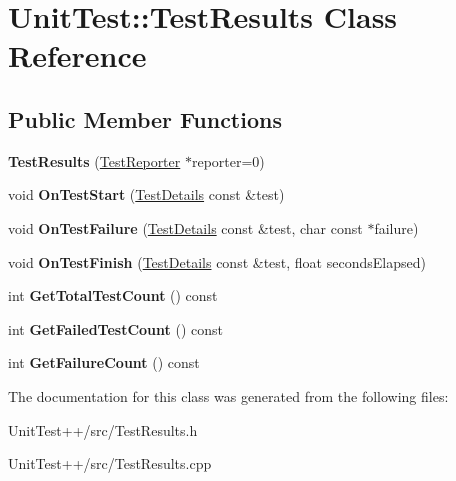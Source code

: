 \hypertarget{classUnitTest_1_1TestResults}{\section{Unit\-Test\-:\-:Test\-Results Class Reference}
\label{classUnitTest_1_1TestResults}
}
\subsection*{Public Member Functions}
\begin{DoxyCompactItemize}
\item 
\hypertarget{classUnitTest_1_1TestResults_af4e4405017e0c8e5dd8cca212adf049b}{{\bfseries Test\-Results} (\hyperlink{classUnitTest_1_1TestReporter}{Test\-Reporter} $\ast$reporter=0)}\label{classUnitTest_1_1TestResults_af4e4405017e0c8e5dd8cca212adf049b}

\item 
\hypertarget{classUnitTest_1_1TestResults_ad37dd4b529bbdcd83f6c48e9140a6007}{void {\bfseries On\-Test\-Start} (\hyperlink{classUnitTest_1_1TestDetails}{Test\-Details} const \&test)}\label{classUnitTest_1_1TestResults_ad37dd4b529bbdcd83f6c48e9140a6007}

\item 
\hypertarget{classUnitTest_1_1TestResults_a37dbb0baa9ba978238a4ba7c2a89b53c}{void {\bfseries On\-Test\-Failure} (\hyperlink{classUnitTest_1_1TestDetails}{Test\-Details} const \&test, char const $\ast$failure)}\label{classUnitTest_1_1TestResults_a37dbb0baa9ba978238a4ba7c2a89b53c}

\item 
\hypertarget{classUnitTest_1_1TestResults_a0b35af87ce16d6064bc3cef5b6d85d0f}{void {\bfseries On\-Test\-Finish} (\hyperlink{classUnitTest_1_1TestDetails}{Test\-Details} const \&test, float seconds\-Elapsed)}\label{classUnitTest_1_1TestResults_a0b35af87ce16d6064bc3cef5b6d85d0f}

\item 
\hypertarget{classUnitTest_1_1TestResults_a01c7d08d38520aabddbb31acccaf6269}{int {\bfseries Get\-Total\-Test\-Count} () const }\label{classUnitTest_1_1TestResults_a01c7d08d38520aabddbb31acccaf6269}

\item 
\hypertarget{classUnitTest_1_1TestResults_ab1a492236db33a8a00a1c0048bbe32de}{int {\bfseries Get\-Failed\-Test\-Count} () const }\label{classUnitTest_1_1TestResults_ab1a492236db33a8a00a1c0048bbe32de}

\item 
\hypertarget{classUnitTest_1_1TestResults_a008043809cf05629adf8bbeb1492a821}{int {\bfseries Get\-Failure\-Count} () const }\label{classUnitTest_1_1TestResults_a008043809cf05629adf8bbeb1492a821}

\end{DoxyCompactItemize}


The documentation for this class was generated from the following files\-:\begin{DoxyCompactItemize}
\item 
Unit\-Test++/src/Test\-Results.\-h\item 
Unit\-Test++/src/Test\-Results.\-cpp\end{DoxyCompactItemize}
